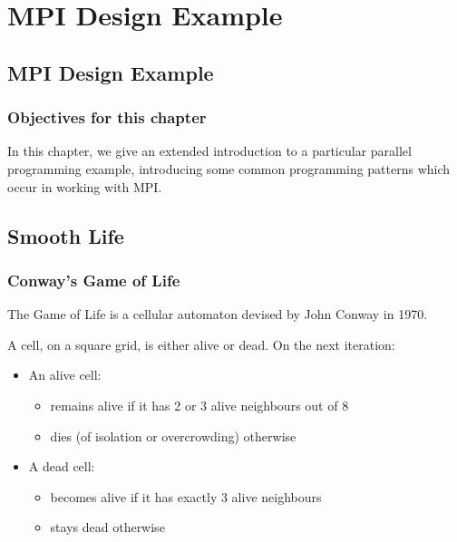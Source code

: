 \section{MPI Design Example}\label{mpi-design-example}

\subsection{MPI Design Example}\label{mpi-design-example-1}

\subsubsection{Objectives for this
chapter}\label{objectives-for-this-chapter}

In this chapter, we give an extended introduction to a particular
parallel programming example, introducing some common programming
patterns which occur in working with MPI.

\subsection{Smooth Life}\label{smooth-life}

\subsubsection{Conway's Game of Life}\label{conways-game-of-life}

The Game of Life is a cellular automaton devised by John Conway in 1970.

A cell, on a square grid, is either alive or dead. On the next
iteration:

\begin{itemize}
\itemsep1pt\parskip0pt
\item
  An alive cell:

  \begin{itemize}
  \itemsep1pt\parskip0pt
  \item
    remains alive if it has 2 or 3 alive neighbours out of 8
  \item
    dies (of isolation or overcrowding) otherwise
  \end{itemize}
\item
  A dead cell:

  \begin{itemize}
  \itemsep1pt\parskip0pt
  \item
    becomes alive if it has exactly 3 alive neighbours
  \item
    stays dead otherwise
  \end{itemize}
\end{itemize}

